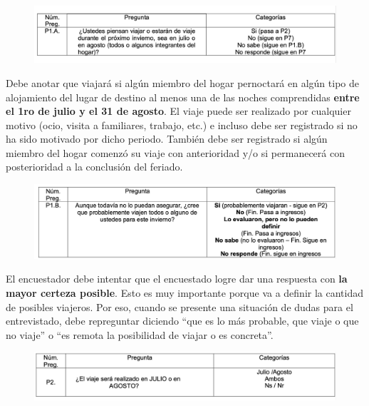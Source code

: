 \documentclass[
  openany]{book}
\begin{document}
\begin{figure}

{\centering \includegraphics[width=1\linewidth]{imagenes/figura6-304} 

}

\end{figure}

Debe anotar que viajará si algún miembro del hogar pernoctará en algún tipo de alojamiento del lugar de destino al menos una de las noches comprendidas \textbf{entre el 1ro de julio y el 31 de agosto}. El viaje puede ser realizado por cualquier motivo (ocio, visita a familiares, trabajo, etc.) e incluso debe ser registrado si no ha sido motivado por dicho periodo. También debe ser registrado si algún miembro del hogar comenzó su viaje con anterioridad y/o si permanecerá con posterioridad a la conclusión del feriado.

\begin{figure}

{\centering \includegraphics[width=1\linewidth]{imagenes/figura6-305} 

}

\end{figure}

El encuestador debe intentar que el encuestado logre dar una respuesta con \textbf{la mayor certeza posible}. Esto es muy importante porque va a definir la cantidad de posibles viajeros. Por eso, cuando se presente una situación de dudas para el entrevistado, debe repreguntar diciendo ``que es lo más probable, que viaje o que no viaje'' o ``es remota la posibilidad de viajar o es concreta''.

\begin{figure}

{\centering \includegraphics[width=1\linewidth]{imagenes/figura6-306} 

}

\end{figure}
\end{document}
